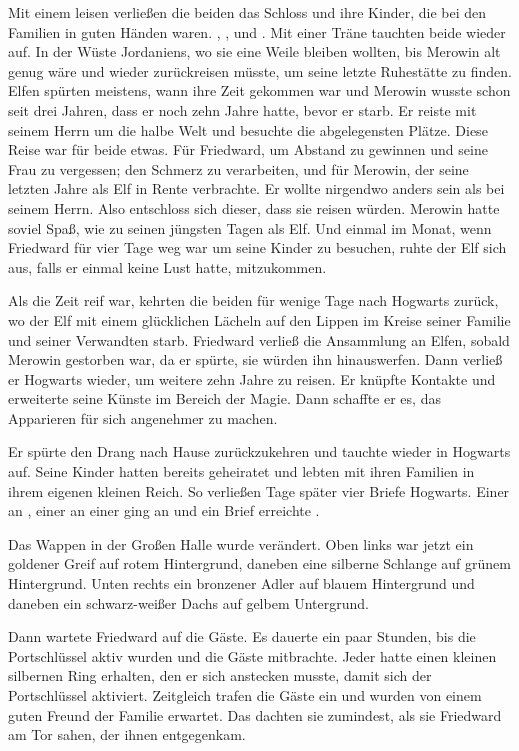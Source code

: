 Mit einem leisen  verließen die beiden das Schloss und ihre Kinder, die bei den Familien in guten Händen waren. , ,  und . Mit einer Träne tauchten beide wieder auf. In der Wüste Jordaniens, wo sie eine Weile bleiben wollten, bis Merowin alt genug wäre und wieder zurückreisen müsste, um seine letzte Ruhestätte zu finden. Elfen spürten meistens, wann ihre Zeit gekommen war und Merowin wusste schon seit drei Jahren, dass er noch zehn Jahre hatte, bevor er starb. Er reiste mit seinem Herrn um die halbe Welt und besuchte die abgelegensten Plätze. Diese Reise war für beide etwas. Für Friedward, um Abstand zu gewinnen und seine Frau zu vergessen; den Schmerz zu verarbeiten, und für Merowin, der seine letzten Jahre als Elf in Rente verbrachte. Er wollte nirgendwo anders sein als bei seinem Herrn. Also entschloss sich dieser, dass sie reisen würden. Merowin hatte soviel Spaß, wie zu seinen jüngsten Tagen als Elf. Und einmal im Monat, wenn Friedward für vier Tage weg war um seine Kinder zu besuchen, ruhte der Elf sich aus, falls er einmal keine Lust hatte, mitzukommen.

Als die Zeit reif war, kehrten die beiden für wenige Tage nach Hogwarts zurück, wo der Elf mit einem glücklichen Lächeln auf den Lippen im Kreise seiner Familie und seiner Verwandten starb. Friedward verließ die Ansammlung an Elfen, sobald Merowin gestorben war, da er spürte, sie würden ihn hinauswerfen. Dann verließ er Hogwarts wieder, um weitere zehn Jahre zu reisen. Er knüpfte Kontakte und erweiterte seine Künste im Bereich der Magie. Dann schaffte er es, das Apparieren für sich angenehmer zu machen.

Er spürte den Drang nach Hause zurückzukehren und tauchte wieder in Hogwarts auf. Seine Kinder hatten bereits geheiratet und lebten mit ihren Familien in ihrem eigenen kleinen Reich. So verließen Tage später vier Briefe Hogwarts. Einer an , einer an  einer ging an  und ein Brief erreichte .

Das Wappen in der Großen Halle wurde verändert. Oben links war jetzt ein goldener Greif auf rotem Hintergrund, daneben eine silberne Schlange auf grünem Hintergrund. Unten rechts ein bronzener Adler auf blauem Hintergrund und daneben ein schwarz-weißer Dachs auf gelbem Untergrund.

Dann wartete Friedward auf die Gäste. Es dauerte ein paar Stunden, bis die Portschlüssel aktiv wurden und die Gäste mitbrachte. Jeder hatte einen kleinen silbernen Ring erhalten, den er sich anstecken musste, damit sich der Portschlüssel aktiviert. Zeitgleich trafen die Gäste ein und wurden von einem guten Freund der Familie erwartet. Das dachten sie zumindest, als sie Friedward am Tor sahen, der ihnen entgegenkam.

